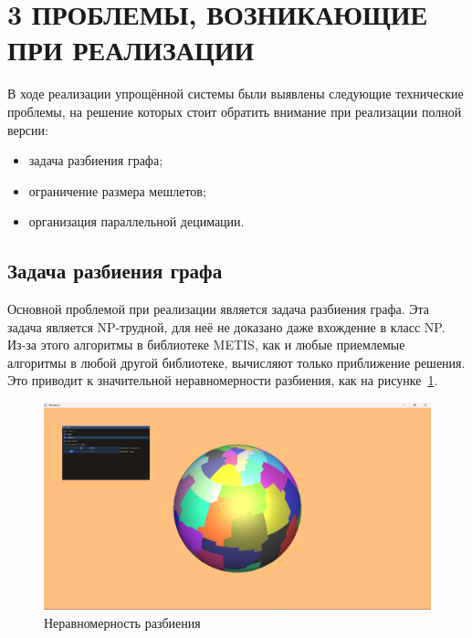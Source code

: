 \clearpage
\section{3 ПРОБЛЕМЫ, ВОЗНИКАЮЩИЕ ПРИ РЕАЛИЗАЦИИ}
В ходе реализации упрощённой системы были выявлены следующие технические проблемы, на решение которых стоит обратить внимание при реализации полной версии:
\begin{itemize}
    \item задача разбиения графа;
    \item ограничение размера мешлетов;
    \item организация параллельной децимации.
\end{itemize}

\subsection*{Задача разбиения графа}
Основной проблемой при реализации является задача разбиения графа.
Эта задача является NP-трудной, для неё не доказано даже вхождение в класс NP.
Из-за этого алгоритмы в библиотеке METIS, как и любые приемлемые алгоритмы в любой другой библиотеке, вычисляют только приближение решения.
Это приводит к значительной неравномерности разбиения, как на рисунке~\ref{fig:sphere-0}.
\begin{figure}[H]
    \centering
    \includegraphics[width=\textwidth]{sphere0.png}
    \caption{Неравномерность разбиения}
    \label{fig:sphere-0}
\end{figure}

